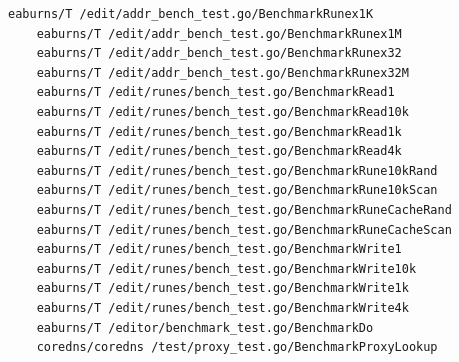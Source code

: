 \documentclass{seal_thesis}
\begin{document}
\begin{lstlisting}[basicstyle=\tiny]
	eaburns/T /edit/addr_bench_test.go/BenchmarkRunex1K
	eaburns/T /edit/addr_bench_test.go/BenchmarkRunex1M
	eaburns/T /edit/addr_bench_test.go/BenchmarkRunex32
	eaburns/T /edit/addr_bench_test.go/BenchmarkRunex32M
	eaburns/T /edit/runes/bench_test.go/BenchmarkRead1
	eaburns/T /edit/runes/bench_test.go/BenchmarkRead10k
	eaburns/T /edit/runes/bench_test.go/BenchmarkRead1k
	eaburns/T /edit/runes/bench_test.go/BenchmarkRead4k
	eaburns/T /edit/runes/bench_test.go/BenchmarkRune10kRand
	eaburns/T /edit/runes/bench_test.go/BenchmarkRune10kScan
	eaburns/T /edit/runes/bench_test.go/BenchmarkRuneCacheRand
	eaburns/T /edit/runes/bench_test.go/BenchmarkRuneCacheScan
	eaburns/T /edit/runes/bench_test.go/BenchmarkWrite1
	eaburns/T /edit/runes/bench_test.go/BenchmarkWrite10k
	eaburns/T /edit/runes/bench_test.go/BenchmarkWrite1k
	eaburns/T /edit/runes/bench_test.go/BenchmarkWrite4k
	eaburns/T /editor/benchmark_test.go/BenchmarkDo
	coredns/coredns /test/proxy_test.go/BenchmarkProxyLookup
\end{lstlisting}
\end{document}
